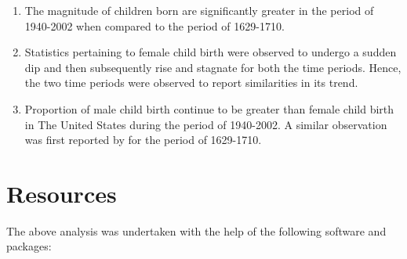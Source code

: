 \documentclass[11pt,a4paper,]{article}
\providecommand{\tightlist}{%
  \setlength{\itemsep}{0pt}\setlength{\parskip}{0pt}}
\begin{document}
\begin{enumerate}
\def\labelenumi{\arabic{enumi}.}
\tightlist
\item
  The magnitude of children born are significantly greater in the period of 1940-2002 when compared to the period of 1629-1710.
\item
  Statistics pertaining to female child birth were observed to undergo a sudden dip and then subsequently rise and stagnate for both the time periods. Hence, the two time periods were observed to report similarities in its trend.
\item
  Proportion of male child birth continue to be greater than female child birth in The United States during the period of 1940-2002. A similar observation was first reported by \textcite{arbuthnot1710ii} for the period of 1629-1710.
\end{enumerate}

\hypertarget{resources}{%
\section{Resources}\label{resources}}

The above analysis was undertaken with the help of the following software and packages:
\end{document}

